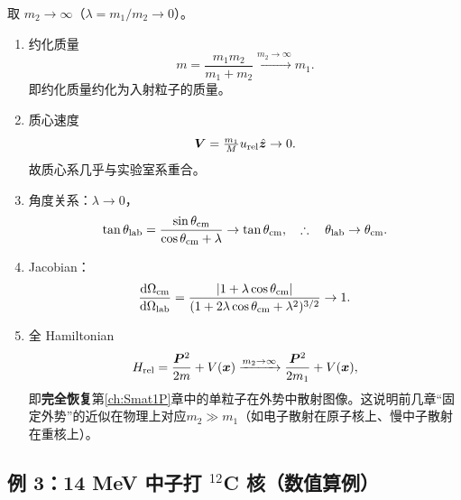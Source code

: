 \begin{example}[重靶恢复单粒子结果]\label{ex:2P-heavy-target}
取 $m_2\to\infty$（$\lambda=m_1/m_2\to 0$）。
\begin{enumerate}
\item[(a)] 约化质量
\[
  m = \frac{m_1 m_2}{m_1+m_2} \xrightarrow{m_2\to\infty} m_1.
\]
即约化质量约化为入射粒子的质量。
\item[(b)] 质心速度
\[
  \bm{V} = \tfrac{m_1}{M}u_{\rm rel}\hat{\bm z}\to 0.
\]
故质心系几乎与实验室系重合。
\item[(c)] 角度关系：$\lambda\to 0$，
\[
  \tan\theta_{\rm lab} = \frac{\sin\theta_{\rm cm}}{\cos\theta_{\rm cm}+\lambda}\to \tan\theta_{\rm cm},
  \quad\therefore\quad \theta_{\rm lab}\to\theta_{\rm cm}.
\]
\item[(d)] Jacobian：
\[
  \frac{\mathrm{d}\Omega_{\rm cm}}{\mathrm{d}\Omega_{\rm lab}}
  = \frac{|1+\lambda\cos\theta_{\rm cm}|}{(1+2\lambda\cos\theta_{\rm cm}+\lambda^2)^{3/2}}\to 1.
\]
\item[(e)] 全 Hamiltonian
\[
  H_{\rm rel} = \frac{\bm{P}^2}{2m}+V(\bm{x}) \xrightarrow{m_2\to\infty} \frac{\bm{P}^2}{2m_1}+V(\bm{x}),
\]
即\textbf{完全恢复}第\ref{ch:Smat1P}章中的单粒子在外势中散射图像。这说明前几章“固定外势”的近似在物理上对应$m_2\gg m_1$（如电子散射在原子核上、慢中子散射在重核上）。
\end{enumerate}
\end{example}

\subsection{例 3：14 MeV 中子打 $^{12}$C 核（数值算例）}

